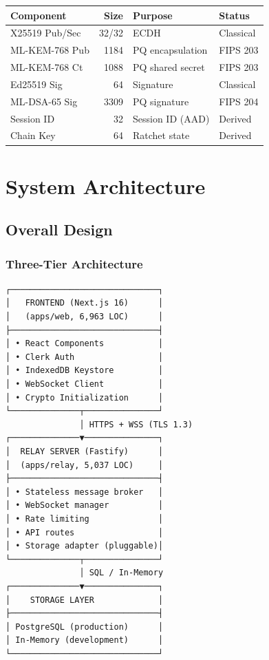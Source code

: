 \documentclass[11pt,a4paper,oneside]{book}
\begin{document}
\begin{table}[h]
\centering
\begin{tabular}{|l|r|l|l|}
\hline
\textbf{Component} & \textbf{Size} & \textbf{Purpose} & \textbf{Status} \\
\hline
X25519 Pub/Sec & 32/32 & ECDH & Classical \\
\hline
ML-KEM-768 Pub & 1184 & PQ encapsulation & FIPS 203 \\
\hline
ML-KEM-768 Ct & 1088 & PQ shared secret & FIPS 203 \\
\hline
Ed25519 Sig & 64 & Signature & Classical \\
\hline
ML-DSA-65 Sig & 3309 & PQ signature & FIPS 204 \\
\hline
Session ID & 32 & Session ID (AAD) & Derived \\
\hline
Chain Key & 64 & Ratchet state & Derived \\
\hline
\end{tabular}
\end{table}
\vspace{-1cm}\part{System Architecture}
\vspace{-0.5cm}\chapter{Overall Design}
\vspace{-0.3cm}\section{Three-Tier Architecture}
\begin{verbatim}
┌──────────────────────────────┐
│   FRONTEND (Next.js 16)      │
│   (apps/web, 6,963 LOC)      │
├──────────────────────────────┤
│ • React Components           │
│ • Clerk Auth                 │
│ • IndexedDB Keystore         │
│ • WebSocket Client           │
│ • Crypto Initialization      │
└──────────────┬───────────────┘
               │ HTTPS + WSS (TLS 1.3)
┌──────────────▼───────────────┐
│  RELAY SERVER (Fastify)      │
│  (apps/relay, 5,037 LOC)     │
├──────────────────────────────┤
│ • Stateless message broker   │
│ • WebSocket manager          │
│ • Rate limiting              │
│ • API routes                 │
│ • Storage adapter (pluggable)│
└──────────────┬───────────────┘
               │ SQL / In-Memory
┌──────────────▼───────────────┐
│    STORAGE LAYER             │
├──────────────────────────────┤
│ PostgreSQL (production)      │
│ In-Memory (development)      │
└──────────────────────────────┘
\end{verbatim}
\end{document}

